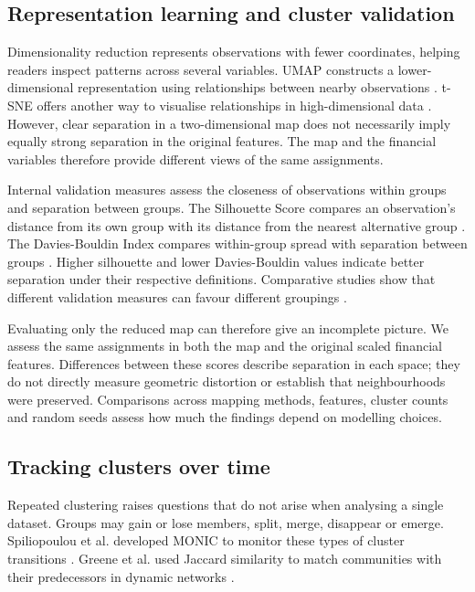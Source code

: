 \subsection{Representation learning and cluster validation}

Dimensionality reduction represents observations with fewer coordinates, helping readers inspect patterns across several variables. UMAP constructs a lower-dimensional representation using relationships between nearby observations \citep{mcinnes2018}. t-SNE offers another way to visualise relationships in high-dimensional data \citep{vandermaaten2008}. However, clear separation in a two-dimensional map does not necessarily imply equally strong separation in the original features. The map and the financial variables therefore provide different views of the same assignments.

Internal validation measures assess the closeness of observations within groups and separation between groups. The Silhouette Score compares an observation's distance from its own group with its distance from the nearest alternative group \citep{rousseeuw1987}. The Davies-Bouldin Index compares within-group spread with separation between groups \citep{davies1979}. Higher silhouette and lower Davies-Bouldin values indicate better separation under their respective definitions. Comparative studies show that different validation measures can favour different groupings \citep{arbelaitz2013,vendramin2010}.

Evaluating only the reduced map can therefore give an incomplete picture. We assess the same assignments in both the map and the original scaled financial features. Differences between these scores describe separation in each space; they do not directly measure geometric distortion or establish that neighbourhoods were preserved. Comparisons across mapping methods, features, cluster counts and random seeds assess how much the findings depend on modelling choices.

\subsection{Tracking clusters over time}

Repeated clustering raises questions that do not arise when analysing a single dataset. Groups may gain or lose members, split, merge, disappear or emerge. Spiliopoulou et al. developed MONIC to monitor these types of cluster transitions \citep{spiliopoulou2006}. Greene et al. used Jaccard similarity to match communities with their predecessors in dynamic networks \citep{greene2010}.

